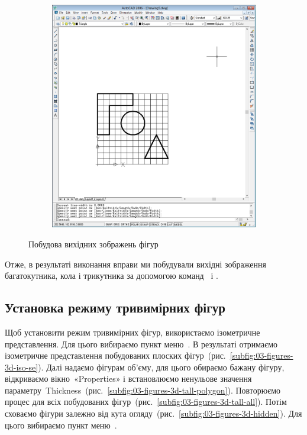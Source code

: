 \documentclass[
	a4paper,
	oneside,
	BCOR = 10mm,
	DIV = 12,
	12pt,
	headings = normal,
]{scrartcl}
\newlength{\gridunitwidth}
\begin{document}
\begin{figure}[!htbp]
\begin{subfigure}[b]{6 \gridunitwidth - (1em / 2)}
					\caption{}
					\label{subfig:02-figures-circle}
				\end{subfigure}%
				\hspace{1em}%
				\begin{subfigure}[b]{6 \gridunitwidth - (1em / 2)}
					\centering
					\includegraphics[width = \columnwidth]{./assets/p06.png}
					\caption{}
					\label{subfig:02-figures-triangle}
				\end{subfigure}
				\caption{Побудова вихідних зображень фігур}
				\label{fig:02-figures}
			\end{figure}

			Отже, в результаті виконання вправи ми побудували вихідні зображення багатокутника, кола і трикутника за допомогою команд~ і .

		\subsection{Установка режиму тривимірних фігур}
			Щоб установити режим тривимірних фігур, використаємо ізометричне представлення. Для цього вибираємо пункт меню~. В результаті отримаємо ізометричне представлення побудованих плоских фігур~(рис.~\ref{subfig:03-figures-3d-iso-se}). Далі надаємо фігурам об'єму, для цього обираємо бажану фігуру, відкриваємо вікно~\textenglish{«Properties»} і встановлюємо ненульове значення параметру~\textenglish{Thickness}~(рис.~\ref{subfig:03-figures-3d-tall-polygon}). Повторюємо процес для всіх побудованих фігур~(рис.~\ref{subfig:03-figures-3d-tall-all}). Потім сховаємо фігури залежно від кута огляду~(рис.~\ref{subfig:03-figures-3d-hidden}). Для цього вибираємо пункт меню~.
\end{document}
